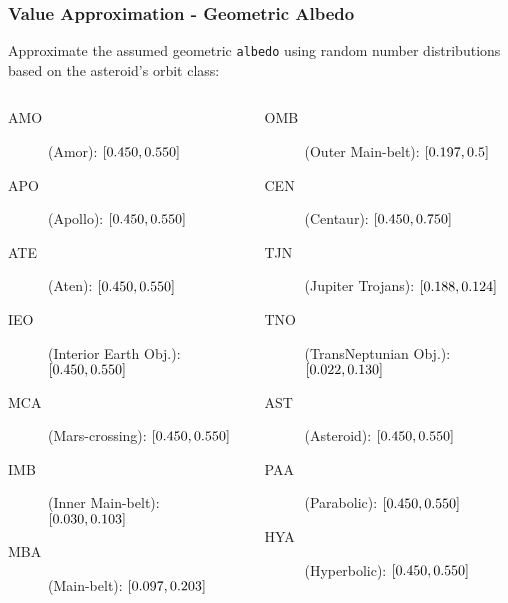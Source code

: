 \begin{frame}[label={orbit_classes}]
    \frametitle{Value Approximation - Geometric Albedo}
    \btVFill
    Approximate the assumed geometric \texttt{albedo} using random number distributions based on the asteroid's orbit class:
    \begin{columns}
        \begin{column}{.5\linewidth}
            \setfontsize{9pt}
            \begin{description}
                \item[AMO] (Amor): $\interval{0.450}{0.550}$
                \item[APO] (Apollo): $\interval{0.450}{0.550}$
                \item[ATE] (Aten): $\interval{0.450}{0.550}$
                \item[IEO] (Interior Earth Obj.): $\interval{0.450}{0.550}$
                \item[MCA] (Mars-crossing): $\interval{0.450}{0.550}$
                \item[IMB] (Inner Main-belt): $\interval{0.030}{0.103}$
                \item[MBA] (Main-belt): $\interval{0.097}{0.203}$
            \end{description}   
        \end{column}
        \hspace*{-1cm}
        \begin{column}{.55\linewidth}
            \setfontsize{9pt}
            \begin{description}
                \item[OMB] (Outer Main-belt): $\interval{0.197}{0.5}$
                \item[CEN] (Centaur): $\interval{0.450}{0.750}$
                \item[TJN] (Jupiter Trojans): $\interval{0.188}{0.124}$
                \item[TNO] (TransNeptunian Obj.): $\interval{0.022}{0.130}$
                \item[AST] (Asteroid): $\interval{0.450}{0.550}$
                \item[PAA] (Parabolic): $\interval{0.450}{0.550}$
                \item[HYA] (Hyperbolic): $\interval{0.450}{0.550}$
            \end{description}
        \end{column}
    \end{columns}

\end{frame}
